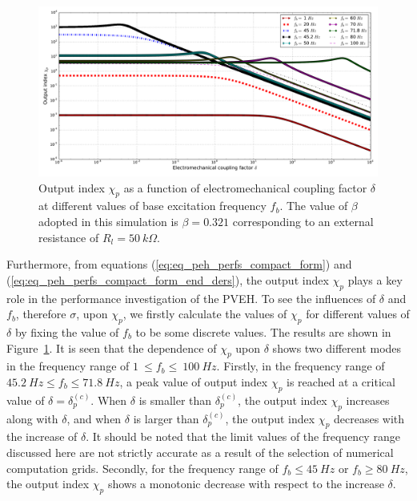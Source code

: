 \documentclass{article}
\begin{document}
\begin{figure}[!htbp]
    \centering
    \includegraphics[width=\textwidth]{./img_eig_asy/fig_sol_analytic_out_index_vs_delta}
    \caption{Output index $\chi_p$ as a function of electromechanical coupling factor $\delta$ at different values of base excitation frequency $f_b$. The value of $\beta$ adopted in this simulation is $\beta = 0.321$ corresponding to an external resistance of $R_l = 50\ k\Omega$. }
    \label{fig:fig_sol_analytic_out_index_vs_delta}
\end{figure}

Furthermore, from equations (\ref{eq:eq_peh_perfs_compact_form}) and (\ref{eq:eq_peh_perfs_compact_form_end_ders}), the output index $\chi_p$ plays a key role in the performance investigation of the PVEH. To see the influences of $\delta$ and $f_b$, therefore $\sigma$, upon $\chi_p$, we firstly calculate the values of $\chi_p$ for different values of $\delta$ by fixing the value of $f_b$ to be some discrete values. The results are shown in Figure~\ref{fig:fig_sol_analytic_out_index_vs_delta}. It is seen that the dependence of $\chi_p$ upon $\delta$ shows two different modes in the frequency range of $1\ \leq f_b \leq \ 100\ Hz$. Firstly, in the frequency range of $45.2\ Hz \leq f_b \leq 71.8\ Hz$, a peak value of output index $\chi_p$ is reached at a critical value of $\delta = \delta_p^{(c)}$. When $\delta$ is smaller than $\delta_p^{(c)}$, the output index $\chi_p$ increases along with $\delta$, and when $\delta$ is larger than $\delta_p^{(c)}$, the output index $\chi_p$ decreases with the increase of $\delta$. It should be noted that the limit values of the frequency range discussed here are not strictly accurate as a result of the selection of numerical computation grids. Secondly, for the frequency range of $f_b \leq 45\ Hz$ or $f_b \geq 80\ Hz$, the output index $\chi_p$ shows a monotonic decrease with respect to the increase $\delta$.
\end{document}
